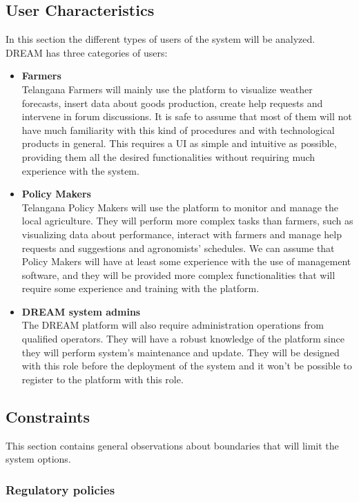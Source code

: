 \documentclass[10pt]{article}
\begin{document}
\subsection{User Characteristics}
In this section the different types of users of the system will be analyzed. DREAM has three categories of users:
\begin{itemize}
    \item \textbf{Farmers}\\
    Telangana Farmers will mainly use the platform to visualize weather forecasts, insert data about goods production, create help requests and intervene
    in forum discussions. It is safe to assume that most of them will not have much familiarity with this kind of procedures and with
    technological products in general. This requires a UI as simple and intuitive as possible, providing them all the desired functionalities
    without requiring much experience with the system. 
    \item \textbf{Policy Makers}\\
    Telangana Policy Makers will use the platform to monitor and manage the local agriculture. They will perform more complex tasks than farmers, such as 
    visualizing data about performance, interact with farmers and manage help requests and suggestions and agronomists' schedules. We can assume that Policy
    Makers will have at least some experience with the use of management software, and they will be provided more complex functionalities that will require 
    some experience and training with the platform.
    \item \textbf{DREAM system admins}\\
    The DREAM platform will also require administration operations from qualified operators. They will have a robust knowledge of the platform since they will 
    perform system's maintenance and update. They will be designed with this role before the deployment of the system and it won't be possible to register to the 
    platform with this role. 
\end{itemize} 
\subsection{Constraints}
This section contains general observations about boundaries that will limit the system options.
\subsubsection{Regulatory policies}
\end{document}
